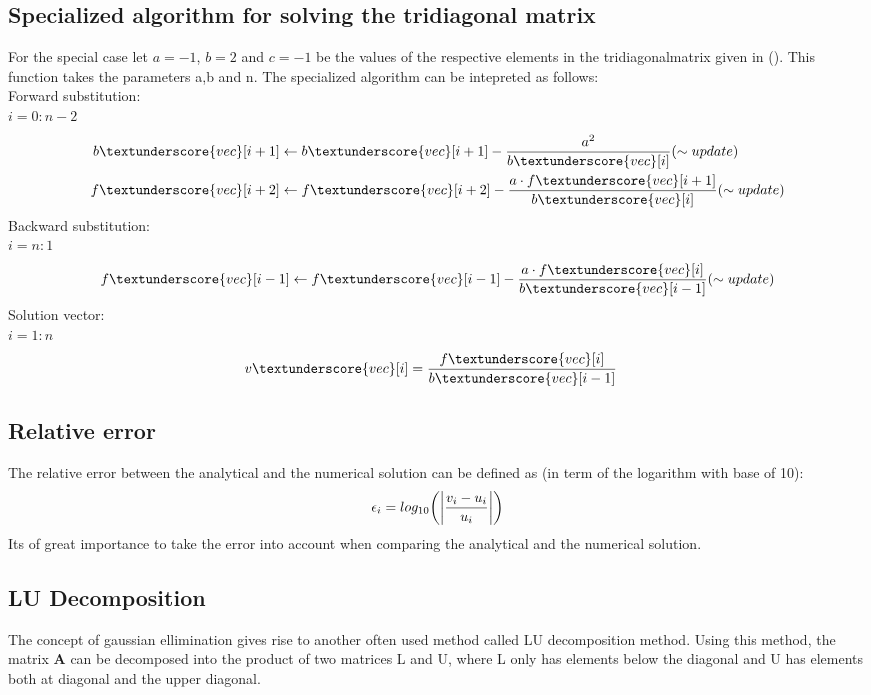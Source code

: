 \documentclass{article}
\begin{document}
\subsection{Specialized algorithm for solving the tridiagonal matrix}
For the special case let $a = -1$, $b = 2$ and $c = -1$ be the values of the respective elements in the tridiagonalmatrix given in (). This function takes the parameters a,b and n. The specialized algorithm can be intepreted as follows: \\
Forward substitution:\\
$i=0:n-2$
\begin{align*}
b\textunderscore{vec}[i+1] & \leftarrow b\textunderscore{vec}[i+1]  - \frac{a^2}{b\textunderscore{vec}[i]}     (\sim update)\\
f\textunderscore{vec}[i+2] &\leftarrow f\textunderscore{vec}[i+2]  - \frac{a \cdot f\textunderscore{vec}[i+1]}{b\textunderscore{vec}[i]}      (\sim update)\\
\end{align*}
Backward substitution: \\
$i = n:1 $
\begin{align*}
f\textunderscore{vec}[i-1] & \leftarrow f\textunderscore{vec}[i-1] - \frac{a \cdot f\textunderscore{vec}[i]}{b\textunderscore{vec}[i-1]}      (\sim update)\\
\end{align*}
Solution vector:\\
$i =1:n$
\begin{align*}
v\textunderscore{vec}[i] & = \frac{f\textunderscore{vec}[i]}{b\textunderscore{vec}[i-1]}
\end{align*}

\subsection{Relative error}
The relative error between the analytical and the numerical solution can be defined as (in term of the logarithm with base of 10):
\begin{equation}
\epsilon_{i} = log_{10}\bigg(\abs{\frac{v_i-u_i}{u_i}}\bigg)
\end{equation}
Its of great importance to take the error into account when comparing the analytical and the numerical solution. 

\subsection{LU Decomposition}
The concept of gaussian ellimination gives rise to another often used method called LU decomposition method. Using this method, the matrix $\textbf{A}$ can be decomposed into the product of two matrices L and U, where L only has elements below the diagonal and U has elements  both at diagonal and the upper diagonal.
\end{document}
